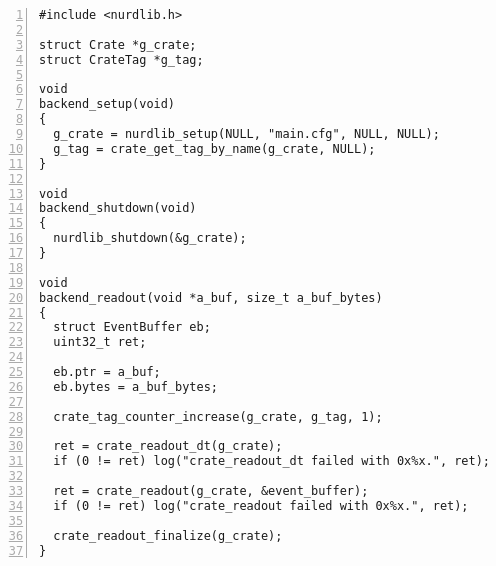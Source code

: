 \documentclass{article}
\begin{document}
\begin{Verbatim}[frame=single,numbers=left]
#include <nurdlib.h>

struct Crate *g_crate;
struct CrateTag *g_tag;

void
backend_setup(void)
{
  g_crate = nurdlib_setup(NULL, "main.cfg", NULL, NULL);
  g_tag = crate_get_tag_by_name(g_crate, NULL);
}

void
backend_shutdown(void)
{
  nurdlib_shutdown(&g_crate);
}

void
backend_readout(void *a_buf, size_t a_buf_bytes)
{
  struct EventBuffer eb;
  uint32_t ret;

  eb.ptr = a_buf;
  eb.bytes = a_buf_bytes;

  crate_tag_counter_increase(g_crate, g_tag, 1);

  ret = crate_readout_dt(g_crate);
  if (0 != ret) log("crate_readout_dt failed with 0x%x.", ret);

  ret = crate_readout(g_crate, &event_buffer);
  if (0 != ret) log("crate_readout failed with 0x%x.", ret);

  crate_readout_finalize(g_crate);
}
\end{Verbatim}
\end{document}
